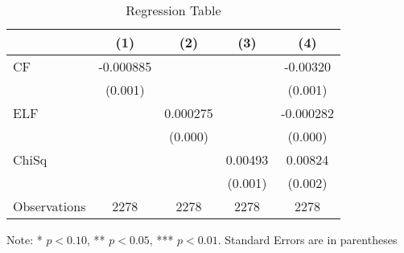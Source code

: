 \begin{table}[htbp]
\caption{Regression Table \label{bwght}}
\centering \renewcommand*{\arraystretch}{1.2}
\begin{threeparttable}
\begin{tabular}{l*{4}{c}}
\hline
            &\multicolumn{1}{c}{(1)}&\multicolumn{1}{c}{(2)}&\multicolumn{1}{c}{(3)}&\multicolumn{1}{c}{(4)}\\
\hline
CF          &   -0.000885         &                     &                     &    -0.00320\sym{***}\\
            &     (0.001)         &                     &                     &     (0.001)         \\
ELF         &                     &    0.000275\sym{**} &                     &   -0.000282         \\
            &                     &     (0.000)         &                     &     (0.000)         \\
ChiSq       &                     &                     &     0.00493\sym{***}&     0.00824\sym{***}\\
            &                     &                     &     (0.001)         &     (0.002)         \\
\hline
Observations&        2278         &        2278         &        2278         &        2278         \\
\hline \hline
\end{tabular}
\begin{tablenotes} \footnotesize
\item Note: * \(p<0.10\), ** \(p<0.05\), *** \(p<0.01\). Standard Errors are in parentheses
\end{tablenotes}
\end{threeparttable}
\end{table}
